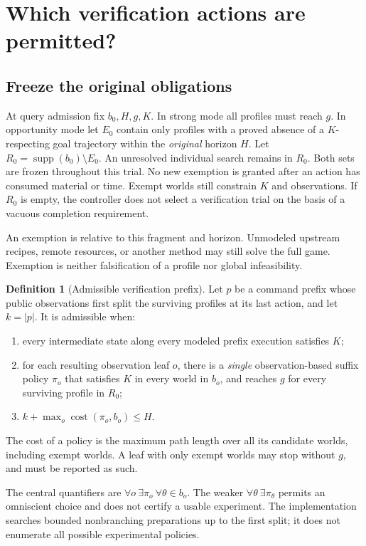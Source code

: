 \documentclass[11pt]{article}
\theoremstyle{definition}
\newtheorem{definition}[theorem]{Definition}
\newcommand{\cost}{\operatorname{cost}}
\newcommand{\supp}{\operatorname{supp}}
\begin{document}
\section{Which verification actions are permitted?}
\subsection{Freeze the original obligations}
At query admission fix $b_0,H,g,K$. In strong mode all profiles must reach $g$.
In opportunity mode let $E_0$ contain only profiles with a proved absence of a
$K$-respecting goal trajectory within the \emph{original} horizon $H$. Let
$R_0=\supp(b_0)\setminus E_0$. An unresolved individual search remains in $R_0$.
Both sets are frozen throughout this trial. No new exemption is granted after
an action has consumed material or time. Exempt worlds still constrain $K$ and
observations. If $R_0$ is empty, the controller does not select a verification
trial on the basis of a vacuous completion requirement.

An exemption is relative to this fragment and horizon. Unmodeled upstream
recipes, remote resources, or another method may still solve the full game.
Exemption is neither falsification of a profile nor global infeasibility.

\begin{definition}[Admissible verification prefix]\label{def:admit}
Let $p$ be a command prefix whose public observations first split the surviving
profiles at its last action, and let $k=|p|$. It is admissible when:
\begin{enumerate}[label=(\roman*)]
\item every intermediate state along every modeled prefix execution satisfies $K$;
\item for each resulting observation leaf $o$, there is a \emph{single}
observation-based suffix policy $\pi_o$ that satisfies $K$ in every world in
$b_o$, and reaches $g$ for every surviving profile in $R_0$;
\item $k+\max_o\cost(\pi_o,b_o)\leq H$.
\end{enumerate}
The cost of a policy is the maximum path length over all its candidate worlds,
including exempt worlds. A leaf with only exempt worlds may stop without $g$,
and must be reported as such.
\end{definition}
The central quantifiers are $\forall o\ \exists\pi_o\ \forall\theta\in b_o$.
The weaker $\forall\theta\ \exists\pi_\theta$ permits an omniscient choice and
does not certify a usable experiment. The implementation searches bounded
nonbranching preparations up to the first split; it does not enumerate all
possible experimental policies.
\end{document}
